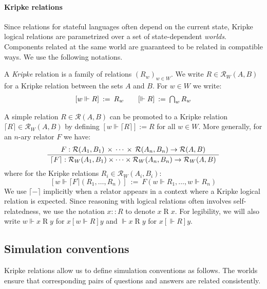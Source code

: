 \documentclass[sigplan,10pt,review]{acmart}
\newcommand{\ifr}[1]{\mathrel{[{#1}]}}
\begin{document}
\paragraph{Kripke relations}

Since relations for stateful languages
often depend on the current state,
Kripke logical relations
are parametrized over a set of state-dependent \emph{worlds}.
Components related at the same world
are guaranteed to be related in compatible ways.
We use the following notations.

\begin{definition} \label{def:klr} %
A \emph{Kripke} relation is
a family of relations $(R_w)_{w \in W}$.
We write $R \in \mathcal{R}_W(A, B)$
for a Kripke relation between the sets $A$ and $B$.
For $w \in W$ we write:
\[
\begin{array}{c@{\qquad}c}
    [w \Vdash R] \: := \: R_w &
    [\Vdash R] \: := \: \bigcap_{w} R_w
\end{array}
\]
\end{definition}

A simple relation $R \in \mathcal{R}(A, B)$
can be promoted to a Kripke relation
$\lceil R \rceil \in \mathcal{R}_W(A, B)$
by defining $[w \Vdash \lceil R \rceil] := R$ for all $w \in W$.
More generally, for an $n$-ary relator $F$ we have:
\[
  \AxiomC{$
    F :
      \mathcal{R}(A_1, B_1) \,\times\,\cdots\,\times\,\mathcal{R}(A_n, B_n)
      \rightarrow \mathcal{R}(A, B)$}
  \UnaryInfC{$
    \lceil F \rceil :
      \mathcal{R}_W(A_1, B_1) \times \cdots \times \mathcal{R}_W(A_n, B_n)
      \rightarrow \mathcal{R}_W(A, B)$}
  \DisplayProof
\]
where for the Kripke relations $R_i \in \mathcal{R}_W(A_i, B_i)$:
\[
  [w \Vdash \lceil F \rceil (R_1, \ldots, R_n)] \: := \:
    F(w \Vdash R_1, \ldots, w \Vdash R_n)
\]
We use $\lceil - \rceil$ implicitly
when a relator appears in a context where
a Kripke logical relation is expected.
Since reasoning with logical relations
often involves self-relatedness,
we use the notation
$x :: R$ to denote $x \mathrel{R} x$.
For legibility, we will also write
$w \Vdash x \mathrel{R} y$ for $x \ifr{w \Vdash R} y$
and $\Vdash x \mathrel{R} y$ for $x \ifr{\Vdash R} y$.


\subsection{Simulation conventions} \label{sec:simconv} %

Kripke relations allow us
to define simulation conventions as follows.
The worlds ensure that corresponding pairs of
questions and answers are related consistently.
\end{document}
